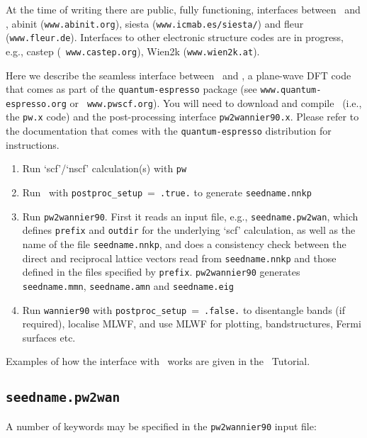 At the time of writing there are public, fully functioning, interfaces
between \wannier\ and \pwscf,  {\sc abinit} ({\tt www.abinit.org}), {\sc siesta} ({\tt www.icmab.es/siesta/})
and {\sc fleur} ({\tt www.fleur.de}). Interfaces to other
electronic structure codes are in progress, e.g., {\sc castep} ({\tt
  www.castep.org}), {\sc Wien2k} ({\tt www.wien2k.at}).

Here we describe the
seamless interface between \wannier\ and \pwscf, a
plane-wave DFT code that comes as part of the {\tt quantum-espresso}
package (see {\tt www.quantum-espresso.org} or {\tt
  www.pwscf.org}).
You will need
to download and compile \pwscf\ (i.e., the {\tt pw.x} code) and the
post-processing interface {\tt pw2wannier90.x}. Please refer to the
documentation that comes with the {\tt quantum-espresso} distribution
for instructions. 

\begin{enumerate}
\item Run `scf'/`nscf' calculation(s) with \verb#pw#
\item Run \wannier\ with \verb#postproc_setup#~=~\verb#.true.# to
  generate \verb#seedname.nnkp#
\item Run {\tt pw2wannier90}. First it reads an input file, e.g.,
  \verb#seedname.pw2wan#, which defines \verb#prefix# and
  \verb#outdir# for the underlying `scf' calculation, as well as the
  name of the file \verb#seedname.nnkp#, and does a consistency check
  between the direct and reciprocal lattice vectors read from
  \verb#seedname.nnkp# and those defined in the files specified by
  \verb#prefix#. \verb#pw2wannier90# generates \verb#seedname.mmn#,
  \verb#seedname.amn# and \verb#seedname.eig# 
\item Run \verb#wannier90# with \verb#postproc_setup#~=~\verb#.false.# to
  disentangle bands (if required), localise MLWF, and use MLWF for
  plotting, bandstructures, Fermi surfaces etc.
\end{enumerate}

Examples of how the interface with \pwscf\ works are given in the
\wannier\ Tutorial. 

\subsection{{\tt seedname.pw2wan}}

A number of keywords may be specified in the {\tt pw2wannier90} input file:


